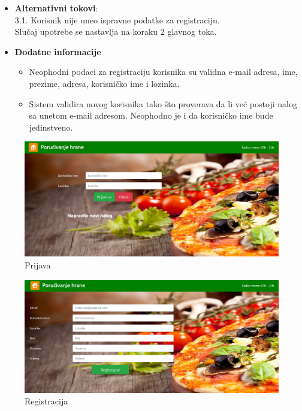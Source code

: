 \begin {itemize}
\item \textbf {Alternativni tokovi}: \\
 3.1. Korisnik nije uneo ispravne podatke za registraciju.\\
 Slučaj upotrebe se nastavlja na koraku 2 glavnog toka.
\end{itemize}
 \begin{itemize} 
    \item \textbf{Dodatne informacije}
    \begin{itemize}
        \item Neophodni podaci za registraciju korisnika su validna e-mail adresa, ime, prezime, adresa, korisničko ime i lozinka.
        \item Sistem validira novog korisnika tako što proverava da li već postoji nalog sa unetom e-mail adresom. Neophodno je i da korisničko ime bude jedinstveno.
    \end{itemize}
\end{itemize}


 \begin{figure}[!h]
    \centering
    \includegraphics[width=1\textwidth]{slike/prijava_dijalog.png}
    \caption{Prijava}
    \label{fig:prijava}
\end{figure}
\begin{figure}[!h]
    \centering
    \includegraphics[height=0.235\textheight]{slike/registracija.png}
    \caption{Registracija}
    \label{fig:reg1}
\end{figure}

